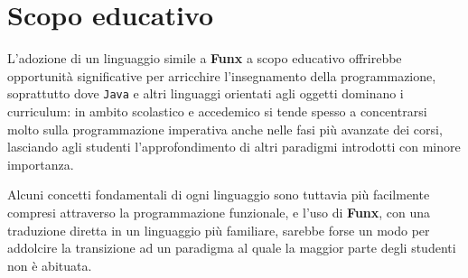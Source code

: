 \section{Scopo educativo}
\label{sec:6-3-educational-purpose}

L'adozione di un linguaggio simile a \textbf{Funx} a scopo educativo offrirebbe opportunità significative
per arricchire l'insegnamento della programmazione, soprattutto dove \texttt{Java} e altri linguaggi
orientati agli oggetti dominano i curriculum: in ambito scolastico e accedemico si tende spesso a concentrarsi
molto sulla programmazione imperativa anche nelle fasi più avanzate dei corsi,
lasciando agli studenti l'approfondimento di altri paradigmi introdotti con minore importanza.

Alcuni concetti fondamentali di ogni linguaggio sono tuttavia più facilmente compresi attraverso la programmazione funzionale,
e l'uso di \textbf{Funx}, con una traduzione diretta in un linguaggio più familiare, sarebbe forse un modo per addolcire
la transizione ad un paradigma al quale la maggior parte degli studenti non è abituata.